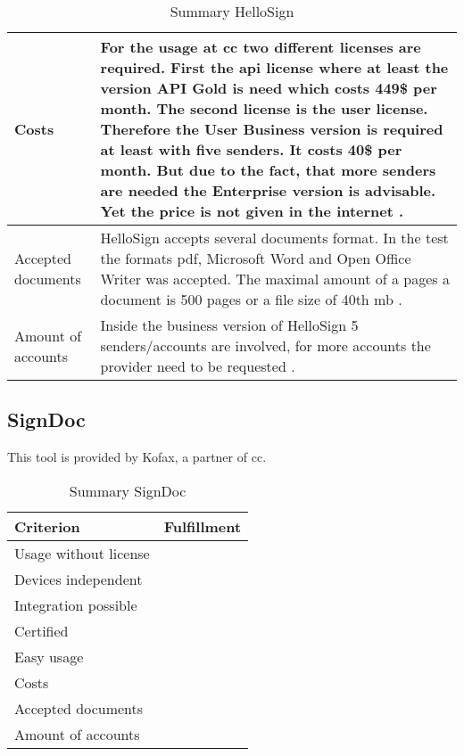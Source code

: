 \begin{table}[h!]
\begin{tabular}{|p{4cm}|p{10cm}|}
		Costs & For the usage at \gls{cc} two different licenses are required. First the \gls{api} license where at least the version API Gold is need which costs 449\$ per month. The second license is the user license. Therefore the User Business version is required at least with five senders. It costs 40\$ per month. But due to the fact, that more senders are needed the Enterprise version is advisable. Yet the price is not given in the internet\parencite{hellosign2018price,hellosign2018api} .\\ \hline
		Accepted documents & HelloSign accepts several documents format. In the test the formats \gls{pdf}, Microsoft Word and Open Office Writer was accepted. The maximal amount of a pages a document is 500 pages or a file size of 40th \gls{mb} \parencite{hellosign2018documents}. \\ \hline
		Amount of accounts & Inside the business version of HelloSign 5 senders/accounts are involved, for more accounts the provider need to be requested \parencite{hellosign2018price}. \\ \hline
	\end{tabular}
	\caption{Summary HelloSign}
	\label{tab:hellosign}
\end{table}
\clearpage

\subsection{SignDoc}
This tool is provided by Kofax, a partner of \gls{cc}.

\begin{table}[h!]
	\begin{tabular}{|p{4cm}|p{10cm}|} \hline
		Criterion & Fulfillment \\ \hline
		Usage without license & \\ \hline
		Devices independent & \\ \hline
		Integration possible & \\ \hline
		Certified & \\ \hline
		Easy usage & \\ \hline
		Costs & \\ \hline
		Accepted documents & \\ \hline
		Amount of accounts & \\ \hline
	\end{tabular}
	\caption{Summary SignDoc}
	\label{tab:signdoc}
\end{table}

